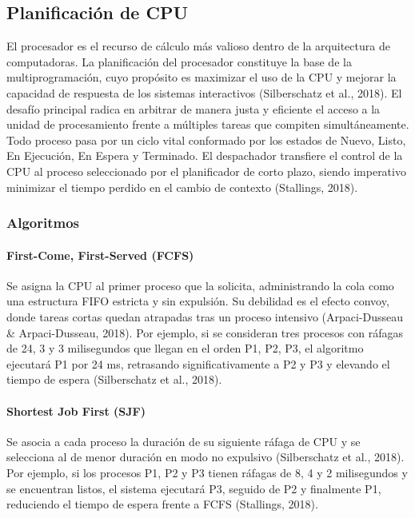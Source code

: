\documentclass[12pt,a4paper]{article}
\begin{document}
\subsection{Planificación de CPU}
El procesador es el recurso de cálculo más valioso dentro de la arquitectura de computadoras. La planificación del procesador constituye la base de la multiprogramación, cuyo propósito es maximizar el uso de la CPU y mejorar la capacidad de respuesta de los sistemas interactivos (Silberschatz et al., 2018). El desafío principal radica en arbitrar de manera justa y eficiente el acceso a la unidad de procesamiento frente a múltiples tareas que compiten simultáneamente. Todo proceso pasa por un ciclo vital conformado por los estados de Nuevo, Listo, En Ejecución, En Espera y Terminado. El despachador transfiere el control de la CPU al proceso seleccionado por el planificador de corto plazo, siendo imperativo minimizar el tiempo perdido en el cambio de contexto (Stallings, 2018).

\subsubsection{Algoritmos}

\paragraph{First-Come, First-Served (FCFS)}
Se asigna la CPU al primer proceso que la solicita, administrando la cola como una estructura FIFO estricta y sin expulsión. Su debilidad es el efecto convoy, donde tareas cortas quedan atrapadas tras un proceso intensivo (Arpaci-Dusseau \& Arpaci-Dusseau, 2018). Por ejemplo, si se consideran tres procesos con ráfagas de 24, 3 y 3 milisegundos que llegan en el orden P1, P2, P3, el algoritmo ejecutará P1 por 24 ms, retrasando significativamente a P2 y P3 y elevando el tiempo de espera (Silberschatz et al., 2018).

\paragraph{Shortest Job First (SJF)}
Se asocia a cada proceso la duración de su siguiente ráfaga de CPU y se selecciona al de menor duración en modo no expulsivo (Silberschatz et al., 2018). Por ejemplo, si los procesos P1, P2 y P3 tienen ráfagas de 8, 4 y 2 milisegundos y se encuentran listos, el sistema ejecutará P3, seguido de P2 y finalmente P1, reduciendo el tiempo de espera frente a FCFS (Stallings, 2018).
\end{document}
